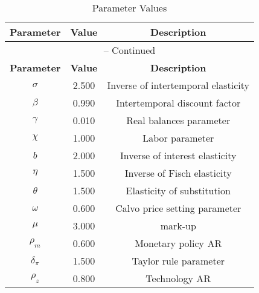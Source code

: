 \begin{center}
\begin{longtable}{ccc}
\caption{Parameter Values}\\%
\toprule%
\multicolumn{1}{c}{\textbf{Parameter}} &
\multicolumn{1}{c}{\textbf{Value}} &
 \multicolumn{1}{c}{\textbf{Description}}\\%
\midrule%
\endfirsthead
\multicolumn{3}{c}{{\tablename} \thetable{} -- Continued}\\%
\midrule%
\multicolumn{1}{c}{\textbf{Parameter}} &
\multicolumn{1}{c}{\textbf{Value}} &
  \multicolumn{1}{c}{\textbf{Description}}\\%
\midrule%
\endhead
$\sigma$ 	 & 	 2.500 	 & 	 Inverse of intertemporal elasticity\\
$\beta$ 	 & 	 0.990 	 & 	 Intertemporal discount factor\\
$\gamma$ 	 & 	 0.010 	 & 	 Real balances parameter\\
$\chi$ 	 & 	 1.000 	 & 	 Labor parameter\\
$b$ 	 & 	 2.000 	 & 	 Inverse of interest elasticity\\
$\eta$ 	 & 	 1.500 	 & 	 Inverse of Fisch elasticity\\
$\theta$ 	 & 	 1.500 	 & 	 Elasticity of substitution\\
$\omega$ 	 & 	 0.600 	 & 	 Calvo price setting parameter\\
$\mu$ 	 & 	 3.000 	 & 	 mark-up\\
$\rho_{m}$ 	 & 	 0.600 	 & 	 Monetary policy AR\\
$\delta_{\pi}$ 	 & 	 1.500 	 & 	 Taylor rule parameter\\
$\rho_z$ 	 & 	 0.800 	 & 	 Technology AR\\
\bottomrule%
\end{longtable}
\end{center}
